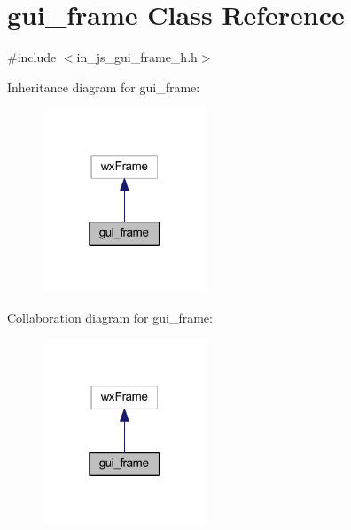 \section{gui\+\_\+frame Class Reference}
\label{classgui__frame}


{\ttfamily \#include $<$in\+\_\+js\+\_\+gui\+\_\+frame\+\_\+h.\+h$>$}



Inheritance diagram for gui\+\_\+frame\+:\nopagebreak
\begin{figure}[H]
\begin{center}
\leavevmode
\includegraphics[width=139pt]{classgui__frame__inherit__graph}
\end{center}
\end{figure}


Collaboration diagram for gui\+\_\+frame\+:\nopagebreak
\begin{figure}[H]
\begin{center}
\leavevmode
\includegraphics[width=139pt]{classgui__frame__coll__graph}
\end{center}
\end{figure}
